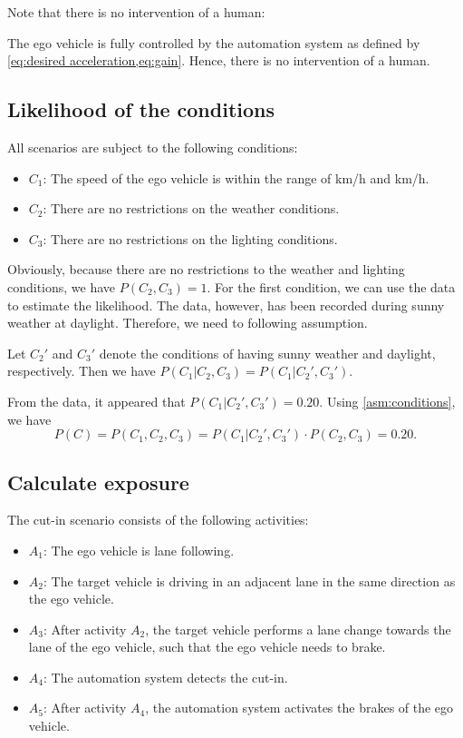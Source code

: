 Note that there is no intervention of a human:
\begin{assumption}
	The ego vehicle is fully controlled by the automation system as defined by \cref{eq:desired acceleration,eq:gain}. Hence, there is no intervention of a human.
\end{assumption}



\subsection{Likelihood of the conditions}
\label{sec:example conditions}

All scenarios are subject to the following conditions:
\begin{itemize}
	\item $C_1$: The speed of the ego vehicle is within the range of \unit[60]{km/h} and \unit[130]{km/h}.
	\item $C_2$: There are no restrictions on the weather conditions.
	\item $C_3$: There are no restrictions on the lighting conditions.
\end{itemize}

Obviously, because there are no restrictions to the weather and lighting conditions, we have $P(C_2,C_3)=1$. For the first condition, we can use the data to estimate the likelihood. The data, however, has been recorded during sunny weather at daylight. Therefore, we need to following assumption.

\begin{assumption} \label{asm:conditions}
	Let $C_2'$ and $C_3'$ denote the conditions of having sunny weather and daylight, respectively. Then we have $P(C_1|C_2,C_3)=P(C_1|C_2',C_3')$.
\end{assumption}

From the data, it appeared that $P(C_1|C_2',C_3')=0.20$. Using \cref{asm:conditions}, we have
\begin{dmath}
	P(C) = P(C_1,C_2,C_3)=P(C_1|C_2',C_3')\cdot P(C_2,C_3)=0.20.
\end{dmath}



\subsection{Calculate exposure}
\label{sec:example exposure}

The cut-in scenario consists of the following activities:
\begin{itemize}
	\item $A_1$: The ego vehicle is lane following.
	\item $A_2$: The target vehicle is driving in an adjacent lane in the same direction as the ego vehicle.
	\item $A_3$: After activity $A_2$, the target vehicle performs a lane change towards the lane of the ego vehicle, such that the ego vehicle needs to brake.
	\item $A_4$: The automation system detects the cut-in.
	\item $A_5$: After activity $A_4$, the automation system activates the brakes of the ego vehicle.
\end{itemize}

